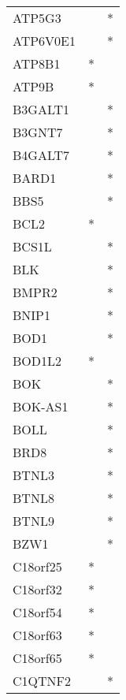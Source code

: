 \begin{longtable}{lcc}
ATP5G3          &                &          * \\
ATP6V0E1        &                &          * \\
ATP8B1          &              * &            \\
ATP9B           &              * &            \\
B3GALT1         &                &          * \\
B3GNT7          &                &          * \\
B4GALT7         &                &          * \\
BARD1           &                &          * \\
BBS5            &                &          * \\
BCL2            &              * &            \\
BCS1L           &                &          * \\
BLK             &                &          * \\
BMPR2           &                &          * \\
BNIP1           &                &          * \\
BOD1            &                &          * \\
BOD1L2          &              * &            \\
BOK             &                &          * \\
BOK-AS1         &                &          * \\
BOLL            &                &          * \\
BRD8            &                &          * \\
BTNL3           &                &          * \\
BTNL8           &                &          * \\
BTNL9           &                &          * \\
BZW1            &                &          * \\
C18orf25        &              * &            \\
C18orf32        &              * &            \\
C18orf54        &              * &            \\
C18orf63        &              * &            \\
C18orf65        &              * &            \\
C1QTNF2         &                &          * \\

\end{longtable}
